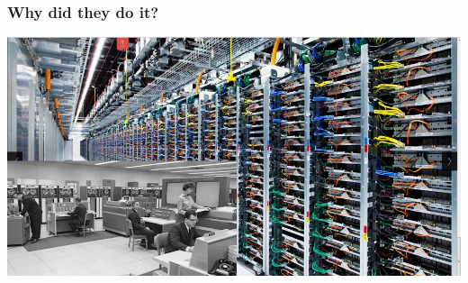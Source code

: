 \documentclass[handout,compress,t,11pt]{beamer}
\begin{document}
\begin{frame}
    \frametitle{Why did they do it?}
    \vspace{0.6\baselineskip}
    \includegraphics[width=\textwidth,height=0.8\textheight]{mainframe-to-google.png}
\end{frame}
\end{document}

